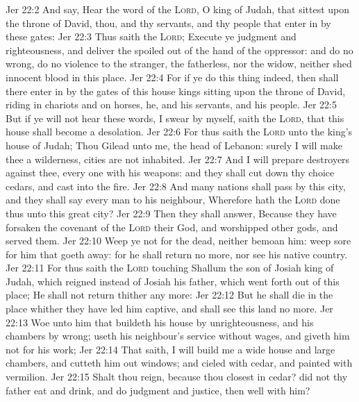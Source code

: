\vs Jer 22:2 And say, Hear the word of the \textsc{Lord}, O king of Judah, that sittest upon the throne of David, thou, and thy servants, and thy people that enter in by these gates:
\vs Jer 22:3 Thus saith the \textsc{Lord}; Execute ye judgment and righteousness, and deliver the spoiled out of the hand of the oppressor: and do no wrong, do no violence to the stranger, the fatherless, nor the widow, neither shed innocent blood in this place.
\vs Jer 22:4 For if ye do this thing indeed, then shall there enter in by the gates of this house kings sitting upon the throne of David, riding in chariots and on horses, he, and his servants, and his people.
\vs Jer 22:5 But if ye will not hear these words, I swear by myself, saith the \textsc{Lord}, that this house shall become a desolation.
\vs Jer 22:6 For thus saith the \textsc{Lord} unto the king's house of Judah; Thou  Gilead unto me,  the head of Lebanon:  surely I will make thee a wilderness,  cities  are not inhabited.
\vs Jer 22:7 And I will prepare destroyers against thee, every one with his weapons: and they shall cut down thy choice cedars, and cast  into the fire.
\vs Jer 22:8 And many nations shall pass by this city, and they shall say every man to his neighbour, Wherefore hath the \textsc{Lord} done thus unto this great city?
\vs Jer 22:9 Then they shall answer, Because they have forsaken the covenant of the \textsc{Lord} their God, and worshipped other gods, and served them.
\vs Jer 22:10 Weep ye not for the dead, neither bemoan him:  weep sore for him that goeth away: for he shall return no more, nor see his native country.
\vs Jer 22:11 For thus saith the \textsc{Lord} touching Shallum the son of Josiah king of Judah, which reigned instead of Josiah his father, which went forth out of this place; He shall not return thither any more:
\vs Jer 22:12 But he shall die in the place whither they have led him captive, and shall see this land no more.
\vs Jer 22:13 Woe unto him that buildeth his house by unrighteousness, and his chambers by wrong;  useth his neighbour's service without wages, and giveth him not for his work;
\vs Jer 22:14 That saith, I will build me a wide house and large chambers, and cutteth him out windows; and  cieled with cedar, and painted with vermilion.
\vs Jer 22:15 Shalt thou reign, because thou closest  in cedar? did not thy father eat and drink, and do judgment and justice,  then  well with him?
